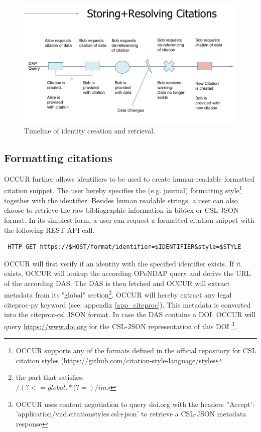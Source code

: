 \documentclass[letterpaper, twocolumn, parskip=half, fontsize=8pt, DIV=calc]{scrartcl}
\begin{document}
\begin{figure}[ht]
 \includegraphics[width=\columnwidth]{figures/storing_resolving.jpg}
 \caption{Timeline of identity creation and retrieval.}
 \label{fig_storingcitation}
\end{figure}

\subsection{Formatting citations}
OCCUR further allows identifiers to be used to create human-readable formatted citation snippet. The user hereby specifies the (e.g. journal) formatting style\footnote{OCCUR supports any of the formats defined in the official repository for \gls{CSL} citation styles (\url{https://github.com/citation-style-language/styles}} together with the identifier. Besides human readable strings, a user can also choose to retrieve the raw bibliographic information in bibtex or CSL-JSON format. In its simplest form, a user can request a formatted citation snippet with the following REST API call.

\begin{lstlisting}
 HTTP GET https://$HOST/format/identifier=$IDENTIFIER&style=$STYLE
\end{lstlisting}

OCCUR will first verify if an identity with the specified identifier exists. If it exists, \gls{OCCUR} will lookup the according OPeNDAP query and derive the URL of the according \gls{DAS}. The \gls{DAS} is then fetched and OCCUR will extract metadata from its "global" section\footnote{the part that satisfies: \\ $/(?<=global {.*(?=})/ims$}. OCCUR will hereby extract any legal citeproc-py keyword (see: appendix \ref{app_citeproc}). This metadata is converted into the citeproc-csl JSON format.
In case the \gls{DAS} contains a \gls{DOI}, OCCUR will query \url{https://www.doi.org} for the CSL-JSON representation of this \gls{DOI} \footnote{OCCUR uses content negotiation to query doi.org with the headers ''Accept': 'application/vnd.citationstyles.csl+json' to retrieve a CSL-JSON metadata response}. 
\end{document}
